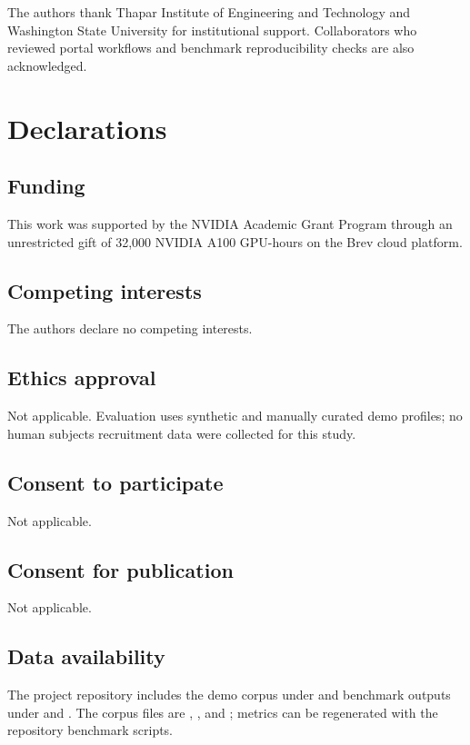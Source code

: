\backmatter


The authors thank Thapar Institute of Engineering and Technology and Washington State University for institutional support.
Collaborators who reviewed portal workflows and benchmark reproducibility checks are also acknowledged.

\section*{Declarations}

\subsection*{Funding}
This work was supported by the NVIDIA Academic Grant Program through an unrestricted gift of 32,000 NVIDIA A100 GPU-hours on the Brev cloud platform.

\subsection*{Competing interests}
The authors declare no competing interests.

\subsection*{Ethics approval}
Not applicable.
Evaluation uses synthetic and manually curated demo profiles; no human subjects recruitment data were collected for this study.

\subsection*{Consent to participate}
Not applicable.

\subsection*{Consent for publication}
Not applicable.

\subsection*{Data availability}
The project repository includes the demo corpus under  and benchmark outputs under  and .
The corpus files are , , and ; metrics can be regenerated with the repository benchmark scripts.

